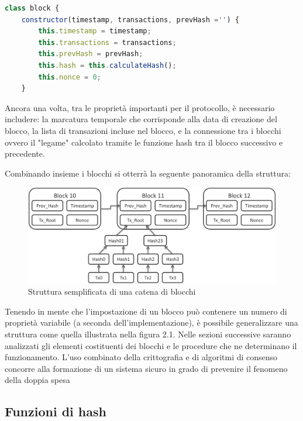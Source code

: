 \begin{lstlisting}[caption={Esempio di struttura di un blocco},language=JavaScript]
class block {
    constructor(timestamp, transactions, prevHash ='') {
        this.timestamp = timestamp;
        this.transactions = transactions;
        this.prevHash = prevHash;
        this.hash = this.calculateHash();
        this.nonce = 0;
    }
\end{lstlisting}

Ancora una volta, tra le proprietà importanti per il protocollo, è necessario includere: la marcatura temporale che corrisponde alla data di creazione del blocco, la lista di transazioni incluse nel blocco, e la connessione tra i blocchi ovvero il "legame" calcolato tramite le funzione hash tra il blocco successivo e precedente. 

Combinando insieme i blocchi si otterrà la seguente panoramica della struttura:

\begin{figure}[h]
\centering
\includegraphics[width=1\textwidth]{immagini/bitcoinblocks.png}
\caption{Struttura semplificata di una catena di blocchi}
\label{fig:mesh1}

\end{figure}

Tenendo in mente che l'impostazione di un blocco può contenere un numero di proprietà variabile (a seconda dell'implementazione), è possibile generalizzare una struttura come quella illustrata nella figura 2.1. Nelle sezioni successive saranno analizzati gli elementi costituenti dei blocchi e le procedure che ne determinano il funzionamento. L'uso combinato della crittografia e di algoritmi di consenso concorre alla formazione di un sistema sicuro in grado di prevenire il fenomeno della doppia spesa%

\subsection{Funzioni di hash}


